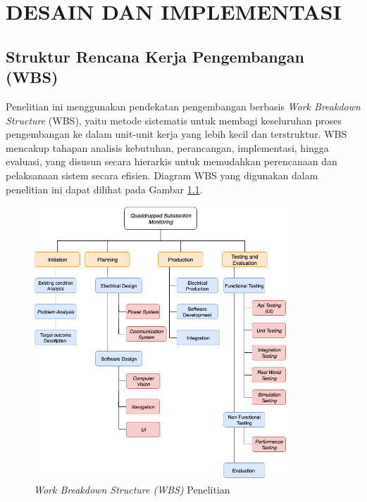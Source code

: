 \chapter{DESAIN DAN IMPLEMENTASI}
\label{chap:desainimplementasi}


\section{Struktur Rencana Kerja Pengembangan (WBS)}
\sloppy
Penelitian ini menggunakan pendekatan pengembangan berbasis \emph{Work Breakdown Structure} (WBS), yaitu metode sistematis untuk membagi keseluruhan proses pengembangan ke dalam unit-unit kerja yang lebih kecil dan terstruktur. WBS mencakup tahapan analisis kebutuhan, perancangan, implementasi, hingga evaluasi, yang disusun secara hierarkis untuk memudahkan perencanaan dan pelaksanaan sistem secara efisien. Diagram WBS yang digunakan dalam penelitian ini dapat dilihat pada Gambar \ref{fig:wbs}.

\begin{figure}[H]
  \centering
  \includegraphics[width=0.85\textwidth]{gambar/bab3/wbs-ta.png}
  \caption{\emph{Work Breakdown Structure (WBS)} Penelitian}
  \label{fig:wbs}
\end{figure}

